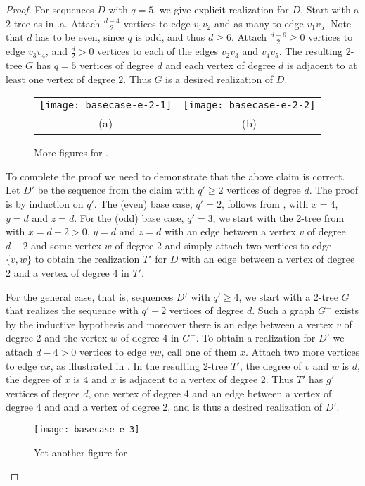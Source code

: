 \documentclass[lotsofwhite,charterfonts]{patmorin}
\begin{document}
\begin{proof}
For sequences $D$ with $q=5$, we give explicit
realization for $D$. Start with a $2$-tree as in
.a. Attach
$\frac{d-4}{2}$ vertices to edge $v_1v_2$ and as many to edge $v_1v_5$. Note
that $d$ has to be even, since $q$ is odd, and thus $d\geq 6$. Attach
$\frac{d-6}{2}\geq 0$ vertices to edge $v_3v_4$, and $\frac{d}{2}>0$
vertices to each of the edges $v_2v_3$ and $v_4v_5$. The resulting $2$-tree
$G$ has $q=5$ vertices of degree $d$ and each vertex of degree $d$ is
adjacent to at least one vertex of degree $2$. Thus $G$ is a desired
realization of $D$.
\begin{figure}
\begin{center}\begin{tabular}{cc}
\texttt{[image: basecase-e-2-1]} &
\texttt{[image: basecase-e-2-2]} \\
(a) & (b) 
\end{tabular}\end{center}
\caption{More figures for .}
\end{figure}

To complete the proof we need to demonstrate that the above claim is
correct. Let $D'$ be the sequence from the claim with $q'\geq 2$
vertices of degree $d$. The proof is by induction on $q'$. The (even)
base case, $q'=2$, follows from , with $x=4$, $y=d$
and $z=d$. For the (odd) base case, $q'=3$, we start with the 2-tree
from   with $x=d-2>0$, $y=d$ and $z=d$ with an edge
between a vertex $v$ of degree $d-2$ and some vertex $w$ of degree 2
and simply attach two vertices to edge $\{v,w\}$ to obtain the
realization $T'$ for $D$ with an edge between a vertex of degree 2 and
a vertex of degree 4 in $T'$.

For the general case, that is, sequences $D'$ with $q'\geq 4$, we
start with a 2-tree $G^-$ that realizes the sequence with $q'-2$
vertices of degree $d$. Such a graph $G^-$ exists by the inductive
hypothesis and moreover there is an edge between a vertex $v$ of
degree 2 and the vertex $w$ of degree 4 in $G^-$. To obtain a
realization for $D'$ we attach $d-4>0$ vertices to edge $vw$, call one
of them $x$. Attach two more vertices to edge $vx$, as illustrated in
. In the resulting 2-tree $T'$, the degree of $v$
and $w$ is $d$, the degree of $x$ is $4$ and $x$ is adjacent to a
vertex of degree 2. Thus $T'$ has $g'$ vertices of degree $d$, one
vertex of degree 4 and an edge between a vertex of degree 4 and 
and a vertex of degree 2,
and is thus a desired realization of $D'$.
\begin{figure}
\begin{center} \texttt{[image: basecase-e-3]} \end{center}
\caption{Yet another figure for .}
\end{figure} 
\end{proof}
\end{document}
